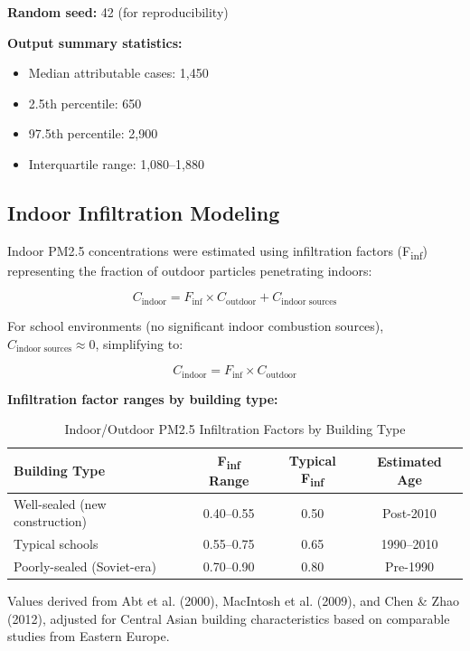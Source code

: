 \documentclass[11pt,a4paper]{article}
\begin{document}
\textbf{Random seed:} 42 (for reproducibility)

\textbf{Output summary statistics:}
\begin{itemize}
    \item Median attributable cases: 1,450
    \item 2.5th percentile: 650
    \item 97.5th percentile: 2,900
    \item Interquartile range: 1,080--1,880
\end{itemize}

\subsection{Indoor Infiltration Modeling}

Indoor PM2.5 concentrations were estimated using infiltration factors (F\textsubscript{inf}) representing the fraction of outdoor particles penetrating indoors:

\begin{equation}
    C_{\text{indoor}} = F_{\text{inf}} \times C_{\text{outdoor}} + C_{\text{indoor sources}}
\end{equation}

For school environments (no significant indoor combustion sources), $C_{\text{indoor sources}} \approx 0$, simplifying to:

\begin{equation}
    C_{\text{indoor}} = F_{\text{inf}} \times C_{\text{outdoor}}
\end{equation}

\textbf{Infiltration factor ranges by building type:}

\begin{table}[H]
\centering
\caption{Indoor/Outdoor PM2.5 Infiltration Factors by Building Type}
\begin{tabular}{lccc}
\toprule
Building Type & F\textsubscript{inf} Range & Typical F\textsubscript{inf} & Estimated Age \\
\midrule
Well-sealed (new construction) & 0.40--0.55 & 0.50 & Post-2010 \\
Typical schools & 0.55--0.75 & 0.65 & 1990--2010 \\
Poorly-sealed (Soviet-era) & 0.70--0.90 & 0.80 & Pre-1990 \\
\bottomrule
\end{tabular}
\end{table}

Values derived from Abt et al. (2000), MacIntosh et al. (2009), and Chen \& Zhao (2012), adjusted for Central Asian building characteristics based on comparable studies from Eastern Europe.
\end{document}
